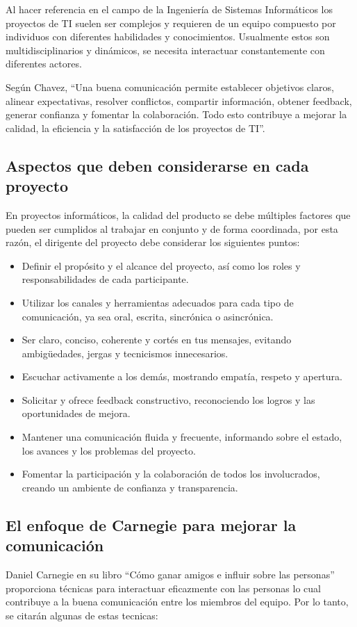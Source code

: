 \documentclass[journal]{IEEEtran}
\begin{document}
Al hacer referencia en el campo de la Ingeniería de Sistemas Informáticos los proyectos de TI suelen ser complejos y requieren de un equipo compuesto por individuos con diferentes habilidades y conocimientos. Usualmente estos son multidisciplinarios y dinámicos, se necesita interactuar constantemente con diferentes actores.

Según Chavez, “Una buena comunicación permite establecer objetivos claros, alinear expectativas, resolver conflictos, compartir información, obtener feedback, generar confianza y fomentar la colaboración. Todo esto contribuye a mejorar la calidad, la eficiencia y la satisfacción de los proyectos de TI”.

\subsection{Aspectos que deben considerarse en cada proyecto}
En proyectos informáticos, la calidad del producto se debe múltiples factores que pueden ser cumplidos al trabajar en conjunto y de forma coordinada, por esta razón, el dirigente del proyecto debe considerar los siguientes puntos:
\begin{itemize}
	\item Definir el propósito y el alcance del proyecto, así como los roles y responsabilidades de cada participante.
	\item Utilizar los canales y herramientas adecuados para cada tipo de comunicación, ya sea oral, escrita, sincrónica o asincrónica.
	\item Ser claro, conciso, coherente y cortés en tus mensajes, evitando ambigüedades, jergas y tecnicismos innecesarios.
	\item Escuchar activamente a los demás, mostrando empatía, respeto y apertura.
	\item Solicitar y ofrece feedback constructivo, reconociendo los logros y las oportunidades de mejora.
	\item Mantener una comunicación fluida y frecuente, informando sobre el estado, los avances y los problemas del proyecto.
	\item Fomentar la participación y la colaboración de todos los involucrados, creando un ambiente de confianza y transparencia.
\end{itemize}

\subsection{El enfoque de Carnegie para mejorar la comunicación}
Daniel Carnegie en su libro “Cómo ganar amigos e influir sobre las personas” proporciona técnicas para interactuar eficazmente con las personas lo cual contribuye a la buena comunicación entre los miembros del equipo. Por lo tanto, se citarán algunas de estas tecnicas:
\end{document}
